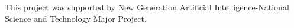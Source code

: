 \documentclass[sigconf]{acmart}
\begin{document}


\begin{acks}
This project was supported by New Generation Artificial Intelligence-National Science and Technology Major Project.
\end{acks}

\balance


\clearpage


\appendix

\end{document}
